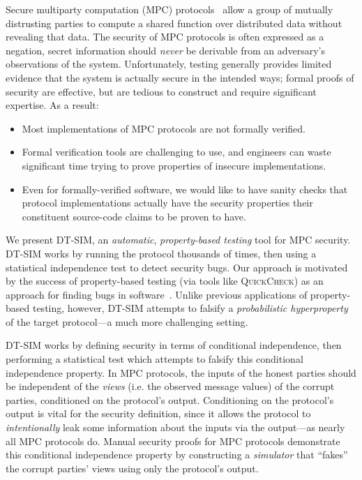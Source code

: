 \documentclass[compsoc, conference, a4paper, 10pt, times]{IEEEtran}
\newcommand{\toolname}{\textsc{DT-SIM}\xspace}
\begin{document}
Secure multiparty computation (MPC) protocols~\cite{evans2018pragmatic} allow a group of mutually distrusting parties to compute a shared function over distributed data without revealing that data. The security of MPC protocols is often expressed as a negation,
\eg{} secret information should \textit{never} be derivable from an adversary's observations of the system.
Unfortunately, testing generally provides limited evidence that the system is actually secure in the intended ways; formal proofs of security are effective, but are tedious to construct and require significant expertise. As a result:
%
\begin{itemize}
\item Most implementations of MPC protocols are not formally verified.
\item Formal verification tools are challenging to use, and engineers can waste significant time trying to prove properties of insecure implementations.
\item Even for formally-verified software, we would like to have sanity checks
  that protocol implementations actually have the security properties their constituent source-code claims to be proven to have.
\end{itemize}

We present \toolname, an \emph{automatic}, \emph{property-based testing} tool for MPC security. \toolname works by running the protocol thousands of times, then using a statistical independence test to detect security bugs. Our approach is motivated by the success of property-based testing (via tools like \textsc{QuickCheck}) as an approach for finding bugs in software~\cite{fink1997property, claessen2000quickcheck, paraskevopoulou2015foundational}. Unlike previous applications of property-based testing, however, \toolname attempts to falsify a \emph{probabilistic hyperproperty} of the target protocol---a much more challenging setting.

\toolname works by defining security in terms of conditional independence, then performing a statistical test which attempts to falsify this conditional independence property. In MPC protocols, the inputs of the honest parties should be independent of the \emph{views} (i.e. the observed message values) of the corrupt parties, conditioned on the protocol's output. Conditioning on the protocol's output is vital for the security definition, since it allows the protocol to \emph{intentionally} leak some information about the inputs via the output---as nearly all MPC protocols do. Manual security proofs for MPC protocols demonstrate this conditional independence property by constructing a \emph{simulator} that ``fakes'' the corrupt parties' views using only the protocol's output.
\end{document}
